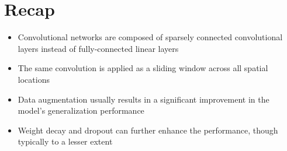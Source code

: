 \documentclass[10pt]{article}
\begin{document}
\section*{Recap}
\begin{itemize}
  \item Convolutional networks are composed of sparsely connected convolutional layers instead of fully-connected linear layers

  \item The same convolution is applied as a sliding window across all spatial locations

  \item Data augmentation usually results in a significant improvement in the model's generalization performance

  \item Weight decay and dropout can further enhance the performance, though typically to a lesser extent

\end{itemize}
\end{document}
